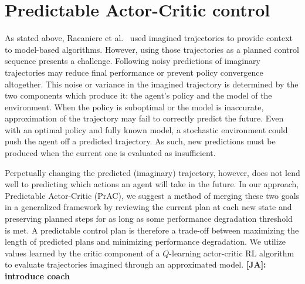 \documentclass[letterpaper]{article} %
\newcommand{\JA}[1] {{\color{red} \textbf{[JA]: #1}}}
\begin{document}

    \section{Predictable Actor-Critic control} \label{section:PAC}


        As stated above, Racaniere et al.~\citeyear{racaniere2017imagination} used imagined trajectories to provide context to model-based algorithms. However, using those trajectories as a planned control sequence presents a challenge. Following noisy predictions of imaginary trajectories may reduce final performance or prevent policy convergence altogether. This noise or variance in the imagined trajectory is determined by the two components which produce it: the agent's policy and the model of the environment. When the policy is suboptimal or the model is inaccurate, approximation of the trajectory may fail to correctly predict the future. Even with an optimal policy and fully known model, a stochastic environment could push the agent off a predicted trajectory. As such, new predictions must be produced when the current one is evaluated as insufficient.

        Perpetually changing the predicted (imaginary) trajectory, however, does not lend well to predicting which actions an agent will take in the future.
        In our approach, Predictable Actor-Critic (PrAC), we suggest a method of merging these two goals in a generalized framework by reviewing the current plan at each new state and preserving planned steps for as long as some performance degradation threshold is met.
        A predictable control plan is therefore a trade-off between maximizing the length of predicted plans and minimizing performance degradation. We utilize values learned by the critic component of a $Q$-learning actor-critic RL algorithm to evaluate trajectories imagined through an approximated model. \JA{introduce coach} 
\end{document}
